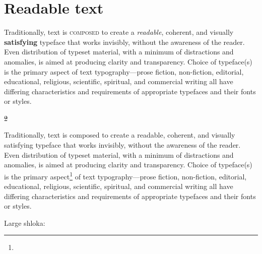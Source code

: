 \documentclass[twoside]{purana}
\begin{document}
\frontmatter

\tableofcontents

\mainmatter

\chapter{Readable text}
Traditionally, text is \textsc{composed} to create a \emph{readable}, coherent, and visually \textbf{satisfying} typeface that works invisibly, without the awareness of the reader. Even distribution of typeset material, with a minimum of  distractions and anomalies, is aimed at producing clarity and transparency. Choice of typeface(s) is the primary aspect of text typography—prose fiction, non-fiction, editorial, educational, religious, scientific, spiritual, and commercial writing all have differing characteristics and requirements of appropriate typefaces and their fonts or styles.

\begin{quote}
\end{quote}

 \st 2\th \etc

Traditionally, text is composed to create a readable, coherent, and visually satisfying typeface that works invisibly, without the awareness of the reader. Even distribution of typeset material, with a minimum of distractions and anomalies, is aimed at producing clarity and transparency. Choice of typeface(s) is the primary aspect\footnote{ \etal} of text typography—prose fiction, non-fiction, editorial, educational, religious, scientific, spiritual, and commercial writing all have differing characteristics and requirements of appropriate typefaces and their fonts or styles.

\begin{quote}
\end{quote}

Large shloka:
\end{document}
